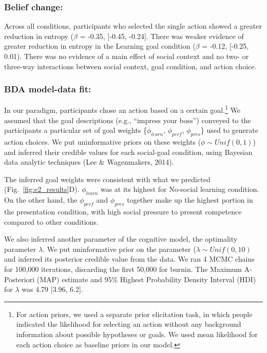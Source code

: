 \documentclass[10pt, letterpaper]{article}
\begin{document}
\subsubsection{Belief change:}\label{belief-change-1}

Across all conditions, participants who selected the single action
showed a greater reduction in entropy (\(\beta\) = -0.35, {[}-0.45,
-0.24{]}. There was weaker evidence of greater reduction in entropy in
the Learning goal condition (\(\beta\) = -0.12, {[}-0.25, 0.01). There
was no evidence of a main effect of social context and no two- or
three-way interactions between social context, goal condition, and
action choice.

\subsubsection{BDA model-data fit:}\label{bda-model-data-fit}

In our paradigm, participants chose an action based on a certain
goal.\footnote{For action priors, we used a separate prior elicitation task, in which people indicated the likelihood for selecting an action without any background information about possible hypotheses or goals. We used mean likelihood for each action choice as baseline priors in our model.}
We assumed that the goal descriptions (e.g., ``impress your boss'')
conveyed to the participants a particular set of goal weights
\{\(\phi_{learn}\), \(\phi_{perf}\), \(\phi_{pres}\)\} used to generate
action choices. We put uninformative priors on these weights
(\(\phi \sim Unif(0,1)\)) and inferred their credible values for each
social-goal condition, using Bayesian data analytic techniques (Lee \&
Wagenmakers, 2014).

The inferred goal weights were consistent with what we predicted
(Fig.~\ref{fig:e2_results}D). \(\phi_{learn}\) was at its highest for
No-social learning condition. On the other hand, the \(\phi_{perf}\) and
\(\phi_{pres}\) together make up the highest portion in the presentation
condition, with high social pressure to present competence compared to
other conditions.

We also inferred another parameter of the cognitive model, the
optimality parameter \(\lambda\). We put uninformative prior on the
parameter (\(\lambda \sim Unif(0,10)\) and inferred its posterior
credible value from the data. We ran 4 MCMC chains for 100,000
iterations, discarding the first 50,000 for burnin. The Maximum A-
Posteriori (MAP) estimate and 95\% Highest Probability Density Interval
(HDI) for \(\lambda\) was 4.79 {[}3.96, 6.2{]}.
\end{document}
